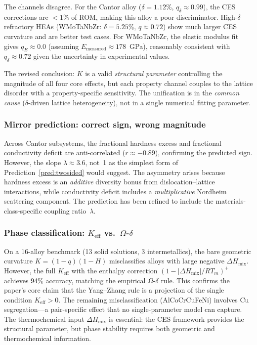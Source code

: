 \documentclass[12pt,letterpaper]{article}
\theoremstyle{definition}
\begin{document}
The channels disagree.  For the Cantor alloy ($\delta = 1.12\%$, $q_\delta \approx 0.99$), the CES corrections are $<1\%$ of ROM, making this alloy a poor discriminator.  High-$\delta$ refractory HEAs (WMoTaNbZr: $\delta = 5.25\%$, $q \approx 0.72$) show much larger CES curvature and are better test cases.  For WMoTaNbZr, the elastic modulus fit gives $q_E \approx 0.0$ (assuming $E_{\mathrm{measured}} \approx 178$~GPa), reasonably consistent with $q_\delta \approx 0.72$ given the uncertainty in experimental values.

The revised conclusion: $K$ is a valid \emph{structural parameter} controlling the magnitude of all four core effects, but each property channel couples to the lattice disorder with a property-specific sensitivity.  The unification is in the \emph{common cause} ($\delta$-driven lattice heterogeneity), not in a single numerical fitting parameter.

\subsubsection{Mirror prediction: correct sign, wrong magnitude}

Across Cantor subsystems, the fractional hardness excess and fractional conductivity deficit are anti-correlated ($r \approx -0.89$), confirming the predicted sign.  However, the slope $\lambda \approx 3.6$, not~1 as the simplest form of Prediction~\ref{pred:twosided} would suggest.  The asymmetry arises because hardness excess is an \emph{additive} diversity bonus from dislocation--lattice interactions, while conductivity deficit includes a \emph{multiplicative} Nordheim scattering component.  The prediction has been refined to include the materials-class-specific coupling ratio~$\lambda$.

\subsubsection{Phase classification: $K_{\mathrm{eff}}$ vs.\ $\Omega$-$\delta$}

On a 16-alloy benchmark (13 solid solutions, 3 intermetallics), the bare geometric curvature $K = (1-q)(1-H)$ misclassifies alloys with large negative $\Delta H_{\mathrm{mix}}$.  However, the full $K_{\mathrm{eff}}$ with the enthalpy correction $(1 - |\Delta H_{\mathrm{mix}}|/RT_m)^+$ achieves 94\% accuracy, matching the empirical $\Omega$-$\delta$ rule.  This confirms the paper's core claim that the Yang--Zhang rule is a projection of the single condition $K_{\mathrm{eff}} > 0$.  The remaining misclassification (AlCoCrCuFeNi) involves Cu segregation---a pair-specific effect that no single-parameter model can capture.  The thermochemical input $\Delta H_{\mathrm{mix}}$ is essential: the CES framework provides the structural parameter, but phase stability requires both geometric and thermochemical information.
\end{document}
